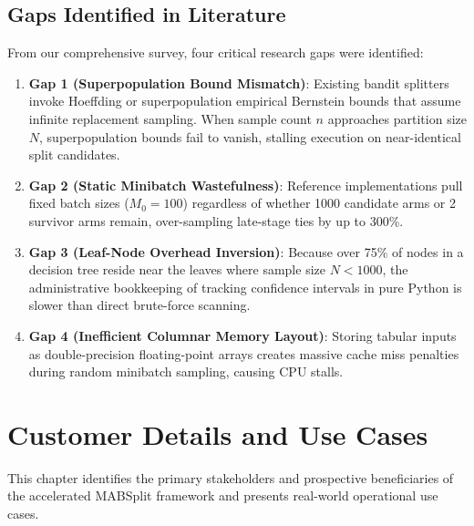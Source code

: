 \documentclass{article}
\begin{document}
	\subsection{Gaps Identified in Literature}
	From our comprehensive survey, four critical research gaps were identified:
	\begin{enumerate}
		\item \textbf{Gap 1 (Superpopulation Bound Mismatch)}: Existing bandit splitters invoke Hoeffding or superpopulation empirical Bernstein bounds that assume infinite replacement sampling. When sample count $n$ approaches partition size $N$, superpopulation bounds fail to vanish, stalling execution on near-identical split candidates.
		\item \textbf{Gap 2 (Static Minibatch Wastefulness)}: Reference implementations pull fixed batch sizes ($M_0 = 100$) regardless of whether 1000 candidate arms or 2 survivor arms remain, over-sampling late-stage ties by up to 300\%.
		\item \textbf{Gap 3 (Leaf-Node Overhead Inversion)}: Because over 75\% of nodes in a decision tree reside near the leaves where sample size $N < 1000$, the administrative bookkeeping of tracking confidence intervals in pure Python is slower than direct brute-force scanning.
		\item \textbf{Gap 4 (Inefficient Columnar Memory Layout)}: Storing tabular inputs as double-precision floating-point arrays creates massive cache miss penalties during random minibatch sampling, causing CPU stalls.
	\end{enumerate}

	\pagebreak
	
	\section{Customer Details and Use Cases}
	This chapter identifies the primary stakeholders and prospective beneficiaries of the accelerated MABSplit framework and presents real-world operational use cases.
\end{document}
